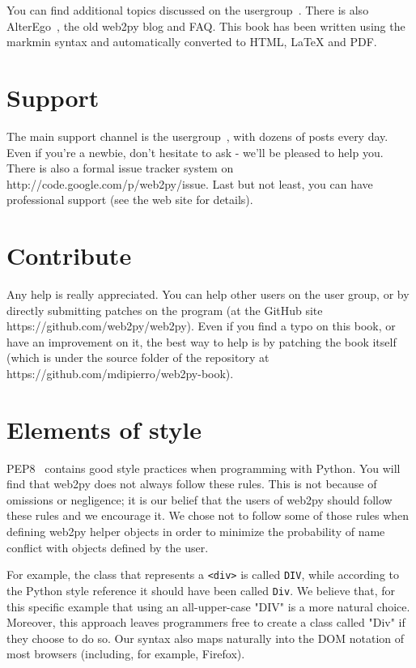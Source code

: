\documentclass[justified,sixbynine,notoc]{tufte-book}
\def\ft{\small\tt}
\def\inxx#1{\index{#1}}
\begin{document}
\begin{fullwidth}
You can find additional topics discussed on the usergroup~\cite{usergroup}. There is also AlterEgo~\cite{alterego}, the old web2py blog and FAQ.
\inxx{MARKMIN}
This book has been written using the markmin syntax and automatically converted to HTML, LaTeX and PDF.

\goodbreak\section{Support}

The main support channel is the usergroup~\cite{usergroup}, with dozens of posts every day. Even if you're a newbie, don't hesitate to ask - we'll be pleased to help you.
There is also a formal issue tracker system on http://code.google.com/p/web2py/issue. Last but not least, you can have professional support (see the web site for details).

\goodbreak\section{Contribute}

Any help is really appreciated. You can help other users on the user group, or by directly submitting patches on the program (at the GitHub site https://github.com/web2py/web2py).
Even if you find a typo on this book, or have an improvement on it, the best way to help is by patching the book itself (which is under the source folder of the repository
at https://github.com/mdipierro/web2py-book).

\goodbreak\section{Elements of style}

PEP8~\cite{style}  contains good style practices when programming with Python. You will find
that web2py does not always follow these rules. This is not because of omissions or negligence; it is our
belief that the users of web2py should follow these rules and we encourage it. We chose not to
follow some of those rules when defining web2py helper objects in order to minimize the probability
of name conflict with objects defined by the user.

For example, the class that represents a {\ft <div>} is called {\ft DIV}, while according to the
Python style reference it should have been called {\ft Div}. We believe that, for this specific example that
using an all-upper-case "DIV" is a more natural choice. Moreover, this approach leaves programmers
free to create a class called "Div" if they choose to do so.
Our syntax also maps naturally into the DOM notation of most browsers (including, for example, Firefox).


\end{fullwidth}
\end{document}
